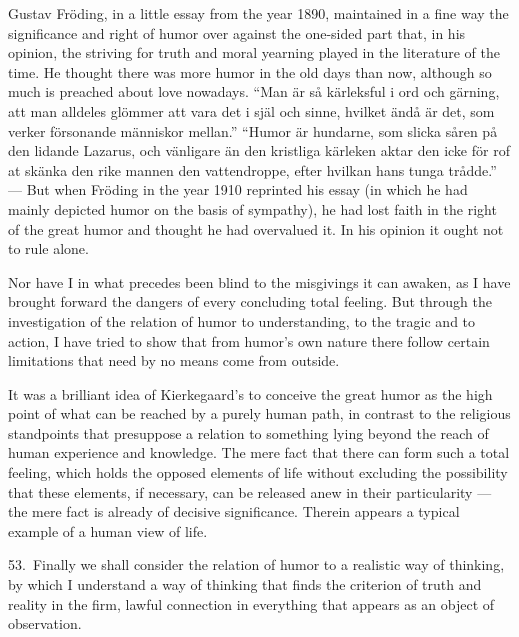 \documentclass[12pt]{book}
\newcommand{\opage}[1]{\marginnote{\footnotesize\textit{[#1]}}}
\begin{document}
Gustav Fröding, in a little essay from the year 1890, maintained in a fine way the significance and
right of humor over against the one-sided part that, in his opinion, \opage{170}the striving for
truth and moral yearning played in the literature of the time. He thought there was more humor in
the old days than now, although so much is preached about love nowadays. ``Man är så kärleksful i
ord och gärning, att man alldeles glömmer att vara det i själ och sinne, hvilket ändå är det, som
verker försonande människor mellan.'' ``Humor är hundarne, som slicka såren på den lidande Lazarus,
och vänligare än den kristliga kärleken aktar den icke för rof at skänka den rike mannen den
vattendroppe, efter hvilkan hans tunga trådde.'' --- But when Fröding in the year 1910 reprinted his
essay (in which he had mainly depicted humor on the basis of sympathy), he had lost faith in the
right of the great humor and thought he had overvalued it. In his opinion it ought not to rule
alone.

Nor have I in what precedes been blind to the misgivings it can awaken, as I have brought forward
the dangers of every concluding total feeling. But through the investigation of the relation of
humor to understanding, to the tragic and to action, I have tried to show that from humor's own
nature there follow certain limitations that need by no means come from outside.

It was a brilliant idea of Kierkegaard's to conceive the great humor as the high point of what can
be reached by a purely human path, in contrast to the religious standpoints that presuppose a
relation to something lying beyond the reach of human experience and knowledge. The mere fact that
there can form such a total feeling, which holds the opposed elements of life without excluding the
possibility that these elements, if necessary, can be released anew in their particularity --- the
mere fact is already of decisive significance. Therein appears a typical example of a human view of
life.

53.~Finally we shall consider the relation of humor to a realistic way of thinking, by which I
understand a way of thinking that finds the criterion of truth and reality in the firm, lawful
connection in everything that appears as an object of observation.
\end{document}
